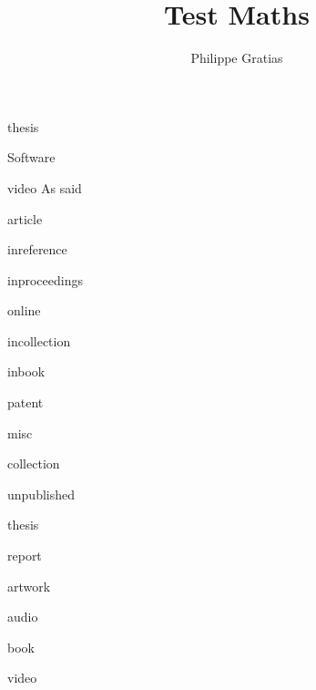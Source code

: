 \documentclass[11pt, oneside]{article}   	%
\title{Test Maths}
\author{Philippe Gratias}
\begin{document}
\maketitle

thesis \cite{tuloup_gestion_2021}

\cite{gross_communicating_2002}

Software \cite{noauthor_hpc-mathssamurai_cras_2021_2021, grootveld_fair_2018}

video As \textcite{grootveld_fair_2018} said

\cite{noauthor_peculiar_1665}

\cite{acharya_2019_2019}

article \cite{cunningham_extraordinary_1957}

inreference \cite{noauthor_initiative_2018}

inproceedings \cite{aksnes_criteria-based_2018}

online \cite{bruck_recognition_2016}

incollection \cite{recknagel_preserve_2018}

inbook \cite{sternberg_writing_2000}

patent \cite{goldman_position_2023}

misc \cite{elser_empairex_2019}

collection \cite{bartling_opening_2014}

unpublished \cite{von_arlitsch_driving_2017}

thesis \cite{bizos_big_2020} \cite{blanchard_retrospective_2022}

report \cite{noauthor_aligning_2022}

artwork \cite{richard_photographs_2016}

audio \cite{ghys_whats_nodate}

book \cite{balibar_life_2017}

video \cite{bechgaard_electrocrystallisation_2023}

\cite{brahe_astronomiae_1602}

\printbibliography
\end{document}
